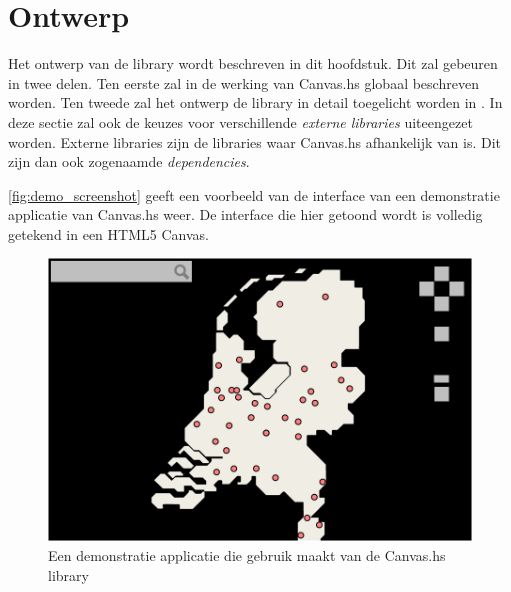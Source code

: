 \chapter{Ontwerp} \label{hoofdstuk:ontwerp}
Het ontwerp van de library wordt beschreven in dit hoofdstuk. Dit zal gebeuren in twee delen. Ten eerste zal in  de werking van Canvas.hs globaal beschreven worden. 
Ten tweede zal het ontwerp de library in detail toegelicht worden in . In deze sectie zal ook de keuzes voor verschillende \emph{externe libraries} uiteengezet worden. Externe libraries zijn de libraries waar Canvas.hs afhankelijk van is. Dit zijn dan ook zogenaamde \emph{dependencies}. 

 \autoref{fig:demo_screenshot} geeft een voorbeeld van de interface van een demonstratie applicatie van Canvas.hs weer. De interface die hier getoond wordt is volledig getekend in een HTML5 Canvas.

\begin{figure}[H]
\begin{center}
\includegraphics[keepaspectratio,width=\textwidth]{./images/demo.png}
\caption{Een demonstratie applicatie die gebruik maakt van de Canvas.hs library}
\label{fig:demo_screenshot}
\end{center}
\end{figure}


